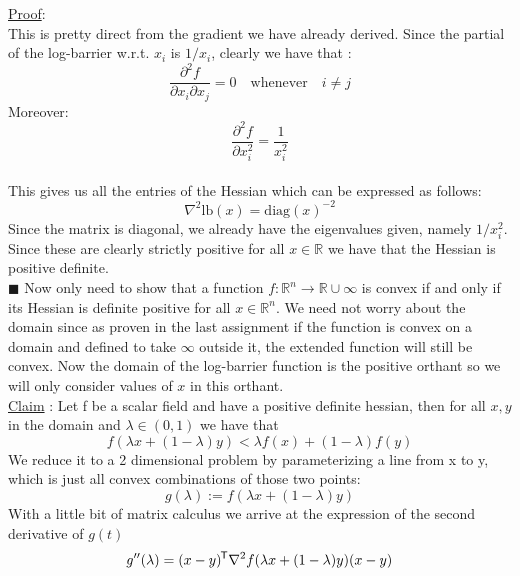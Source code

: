 \documentclass{article}
\newcommand*{\tran}{^{\mkern-1.5mu\mathsf{T}}}%
\begin{document}
\begin{enumerate}[(a)]
		\underline{Proof}: \\
		This is pretty direct from the gradient we have already derived. Since the partial of the log-barrier w.r.t. $x_i$ is $1/x_i$, clearly we have that :
		\begin{equation}
			\frac{\partial^2 f}{\partial x_i \partial x_j} = 0 \quad \text{whenever} \quad i\neq j	
		\end{equation}
		Moreover:
		\begin{equation}
			\frac{\partial^2 f}{\partial x_i^2 } = \frac{1}{x_i^2}
		\end{equation}\\
		This gives us all the entries of the Hessian which can be expressed as follows:
		\begin{equation}\label{hessian}
			\nabla ^2 \mathrm {lb}(x) = \mathrm{diag}(x)^{-2}
		\end{equation}
		Since the matrix is diagonal, we already have the eigenvalues given, namely $1/x_i^2$. Since these are clearly strictly positive for all $x\in \mathbb R$ we have that the Hessian is positive definite.\\
		$\blacksquare$
		\clearpage
		Now only need to show that a function $f : \mathbb{R}^n \rightarrow \mathbb R \cup \infty$ is convex if and only if its Hessian is definite positive for all $x\in \mathbb R^n$. We need not worry about the domain since as proven in the last assignment if the function is convex on a domain and defined to take $\infty$ outside it, the extended function will still be convex. Now the domain of the log-barrier function is the positive orthant so we will only consider values of $x$ in this orthant. \\[2ex]
		\underline{Claim} : Let f be a scalar field and have a positive definite hessian, then for all $x,y$ in the domain and $\lambda \in (0,1)$ we have that
		\begin{equation}\label{claim5}
			f(\lambda x + (1-\lambda)y) < \lambda f(x) + (1-\lambda)f(y)
		\end{equation}
		We reduce it to a 2 dimensional problem by parameterizing a line from x to y, which is just all convex combinations of those two points:
		\begin{equation*}
			g(\lambda) := f(\lambda x + (1-\lambda)y)
		\end{equation*} 
		With a little bit of matrix calculus we arrive at the expression of the second derivative of $g(t)$
		\begin{equation}
			g''(\lambda) = (x - y)\tran \nabla ^2 f(\lambda x + (1-\lambda)y)(x-y)

\end{equation}
\end{enumerate}
\end{document}
